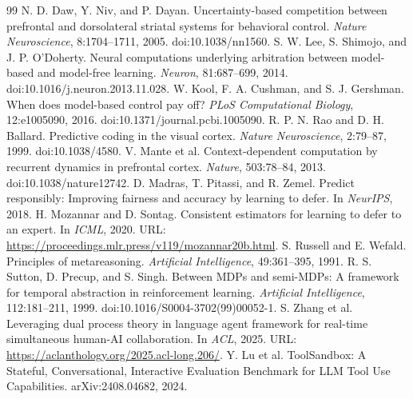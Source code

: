 \documentclass[11pt]{article}
\begin{document}
\begin{thebibliography}{99}
 N. D. Daw, Y. Niv, and P. Dayan. Uncertainty-based competition between prefrontal and dorsolateral striatal systems for behavioral control. \emph{Nature Neuroscience}, 8:1704--1711, 2005. doi:10.1038/nn1560.
 S. W. Lee, S. Shimojo, and J. P. O'Doherty. Neural computations underlying arbitration between model-based and model-free learning. \emph{Neuron}, 81:687--699, 2014. doi:10.1016/j.neuron.2013.11.028.
 W. Kool, F. A. Cushman, and S. J. Gershman. When does model-based control pay off? \emph{PLoS Computational Biology}, 12:e1005090, 2016. doi:10.1371/journal.pcbi.1005090.
 R. P. N. Rao and D. H. Ballard. Predictive coding in the visual cortex. \emph{Nature Neuroscience}, 2:79--87, 1999. doi:10.1038/4580.
 V. Mante et al. Context-dependent computation by recurrent dynamics in prefrontal cortex. \emph{Nature}, 503:78--84, 2013. doi:10.1038/nature12742.
 D. Madras, T. Pitassi, and R. Zemel. Predict responsibly: Improving fairness and accuracy by learning to defer. In \emph{NeurIPS}, 2018.
 H. Mozannar and D. Sontag. Consistent estimators for learning to defer to an expert. In \emph{ICML}, 2020. URL: \url{https://proceedings.mlr.press/v119/mozannar20b.html}.
 S. Russell and E. Wefald. Principles of metareasoning. \emph{Artificial Intelligence}, 49:361--395, 1991.
 R. S. Sutton, D. Precup, and S. Singh. Between MDPs and semi-MDPs: A framework for temporal abstraction in reinforcement learning. \emph{Artificial Intelligence}, 112:181--211, 1999. doi:10.1016/S0004-3702(99)00052-1.
 S. Zhang et al. Leveraging dual process theory in language agent framework for real-time simultaneous human-AI collaboration. In \emph{ACL}, 2025. URL: \url{https://aclanthology.org/2025.acl-long.206/}.
 Y. Lu et al. ToolSandbox: A Stateful, Conversational, Interactive Evaluation Benchmark for LLM Tool Use Capabilities. arXiv:2408.04682, 2024.
\end{thebibliography}
\end{document}
